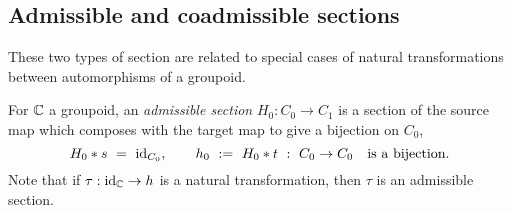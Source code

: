 

\newpage
\subsection{Admissible and coadmissible sections} \label{subsect:admissible}

These two types of section are related to special cases of 
natural transformations between automorphisms of a groupoid. 

For $\mathbb{C}$ a groupoid, an \emph{admissible section} $H_0 : C_0 \to C_1$ 
is a section of the source map which composes with the target map to give 
a bijection on $C_0$, 
$$
H_0 * s ~=~ \mathrm{id}_{C_0}, \qquad 
h_0 ~:=~ H_0 * t ~:~ C_0 \to C_0 \quad\text{is a bijection}. 
$$
Note that if $\tau : \mathrm{id}_{\mathbb{C}} \to h$ is a natural transformation, 
then $\tau$ is an admissible section. 

